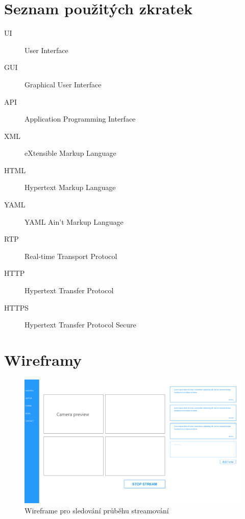 \documentclass[thesis=M,czech]{FITthesis}[2012/06/26]
\begin{document}
\nocite{*}



\appendix

\chapter{Seznam použitých zkratek}
\begin{description}
	\item[UI] User Interface
	\item[GUI] Graphical User Interface
	\item[API] Application Programming Interface
	\item[XML] eXtensible Markup Language
	\item[HTML] Hypertext Markup Language
	\item[YAML] YAML Ain't Markup Language
	\item[RTP] Real-time Transport Protocol
	\item[HTTP] Hypertext Transfer Protocol
	\item[HTTPS] Hypertext Transfer Protocol Secure
\end{description}


\chapter{Wireframy} \label{chap:wireframes}

\begin{figure}[h]\centering
	\includegraphics[width=1\paperwidth, angle=90]{images/ui_wf_ulab-stream.eps}
	\caption{Wireframe pro sledování průběhu streamování}\label{img:navrh_frontend_ui_wf_preview}
\end{figure}
\end{document}
